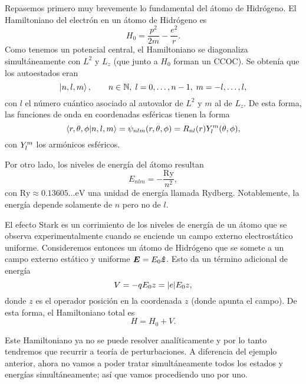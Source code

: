 \documentclass[10pt, a4paper]{article}
\newcommand{\Ry}{\ensuremath{\text{Ry}}}
\numberwithin{equation}{subsection}
\begin{document}
Repasemos primero muy brevemente lo fundamental del átomo de Hidrógeno. El
Hamiltoniano del electrón en un átomo de Hidrógeno es
\begin{equation}
  H_0 = \frac{p^2}{2m} - \frac{e^2}{r}.
\end{equation}
Como tenemos un potencial central, el Hamiltoniano se diagonaliza
simultáneamente con $L^2$ y $L_z$ (que junto a $H_0$ forman un CCOC). Se obtenía
que los autoestados eran
\begin{equation}
  \ket{n,l,m}, \qquad n \in \mathbb{N}, \; l = 0,\dots,n-1, \; m = -l, \ldots,
  l,
\end{equation}
con $l$ el número cuántico asociado al autovalor de $L^2$ y $m$ al de $L_z$. De
esta forma, las funciones de onda en coordenadas esféricas tienen la forma
\begin{equation}
  \braket{r,\theta,\phi}{n,l,m} = \psi_{nlm}(r,\theta,\phi) =
  R_{nl}(r)\SphericalHarmonic{l}{m}(\theta,\phi),
\end{equation}
con $\SphericalHarmonic{l}{m}$ los armónicos esféricos.

Por otro lado, los niveles de energía del átomo resultan
\begin{equation} \label{eq:enehidrogen}
  E_{nlm} = -\frac{\Ry}{n^2},
\end{equation}
con $\Ry \approx 0.13605\ldots \text{eV}$ una unidad de energía llamada
Rydberg. Notablemente, la energía depende solamente de $n$ pero no de $l$.

\bigbreak

El efecto Stark es un corrimiento de los niveles de energía de un átomo que se
observa experimentalmente cuando se enciende un campo externo electrostático
uniforme. Consideremos entonces un átomo de Hidrógeno que se somete a un campo
externo estático y uniforme $\vb*{E} = E_0\vu*{z}$. Esto da un término
adicional de energía
\begin{equation}
  V = -qE_0z = \abs{e}E_0z,
\end{equation}
donde $z$ es el operador posición en la coordenada $z$ (donde apunta el campo).
De esta forma, el Hamiltoniano total es
\begin{equation}
  H = H_{0} + V.
\end{equation}

Este Hamiltoniano ya no se puede resolver analíticamente y por lo tanto
tendremos que recurrir a teoría de perturbaciones. A diferencia del ejemplo
anterior, ahora no vamos a poder tratar simultáneamente todos los estados y
energías simultáneamente; así que vamos procediendo uno por uno.
\end{document}

